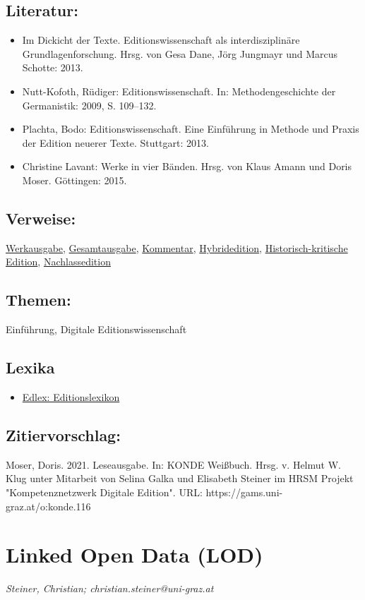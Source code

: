 \documentclass{article}
\begin{document}
        \subsection*{Literatur:}\begin{itemize}\item Im Dickicht der Texte. Editionswissenschaft als interdisziplinäre Grundlagenforschung. Hrsg. von Gesa Dane, Jörg Jungmayr und Marcus Schotte: 2013.\item Nutt-Kofoth, Rüdiger: Editionswissenschaft. In: Methodengeschichte der Germanistik: 2009, S. 109–132.\item Plachta, Bodo: Editionswissenschaft. Eine Einführung in Methode und Praxis der Edition neuerer Texte. Stuttgart: 2013.\item Christine Lavant: Werke in vier Bänden. Hrsg. von Klaus Amann und Doris Moser. Göttingen: 2015.\end{itemize}\subsection*{Verweise:}\href{https://gams.uni-graz.at/o:konde.213}{Werkausgabe}, \href{https://gams.uni-graz.at/o:konde.91}{Gesamtausgabe}, \href{https://gams.uni-graz.at/o:konde.34}{Kommentar}, \href{https://gams.uni-graz.at/o:konde.96}{Hybridedition}, \href{https://gams.uni-graz.at/o:konde.93}{Historisch-kritische Edition}, \href{https://gams.uni-graz.at/o:konde.140}{Nachlassedition}\subsection*{Themen:}Einführung, Digitale Editionswissenschaft\subsection*{Lexika}\begin{itemize}\item \href{https://edlex.de/index.php?title=Leseausgabe}{Edlex: Editionslexikon}\end{itemize}\subsection*{Zitiervorschlag:}Moser, Doris. 2021. Leseausgabe. In: KONDE Weißbuch. Hrsg. v. Helmut W. Klug unter Mitarbeit von Selina Galka und Elisabeth Steiner im HRSM Projekt "Kompetenznetzwerk Digitale Edition". URL: https://gams.uni-graz.at/o:konde.116\newpage\section*{Linked Open Data  (LOD)} \emph{Steiner, Christian; christian.steiner@uni-graz.at}\\
        
\end{document}
